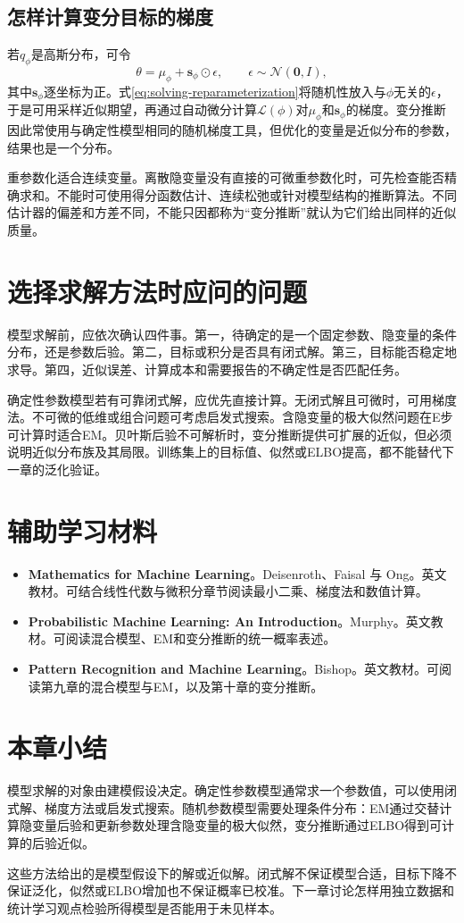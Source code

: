 \subsection{怎样计算变分目标的梯度}
若$q_\phi$是高斯分布，可令
\begin{equation}
 \theta=\mu_\phi+\bm s_\phi\odot\epsilon,
 \qquad \epsilon\sim\mathcal N(\bm0,I),
 \label{eq:solving-reparameterization}
\end{equation}
其中$\bm s_\phi$逐坐标为正。式\eqref{eq:solving-reparameterization}将随机性放入与$\phi$无关的$\epsilon$，于是可用采样近似期望，再通过自动微分计算$\mathcal L(\phi)$对$\mu_\phi$和$\bm s_\phi$的梯度。变分推断因此常使用与确定性模型相同的随机梯度工具，但优化的变量是近似分布的参数，结果也是一个分布。

重参数化适合连续变量。离散隐变量没有直接的可微重参数化时，可先检查能否精确求和。不能时可使用得分函数估计、连续松弛或针对模型结构的推断算法。不同估计器的偏差和方差不同，不能只因都称为“变分推断”就认为它们给出同样的近似质量。

\section{选择求解方法时应问的问题}

模型求解前，应依次确认四件事。第一，待确定的是一个固定参数、隐变量的条件分布，还是参数后验。第二，目标或积分是否具有闭式解。第三，目标能否稳定地求导。第四，近似误差、计算成本和需要报告的不确定性是否匹配任务。

确定性参数模型若有可靠闭式解，应优先直接计算。无闭式解且可微时，可用梯度法。不可微的低维或组合问题可考虑启发式搜索。含隐变量的极大似然问题在E步可计算时适合EM。贝叶斯后验不可解析时，变分推断提供可扩展的近似，但必须说明近似分布族及其局限。训练集上的目标值、似然或ELBO提高，都不能替代下一章的泛化验证。

\section*{辅助学习材料}
\begin{itemize}
\item \textbf{Mathematics for Machine Learning}。Deisenroth、Faisal 与 Ong。英文教材。可结合线性代数与微积分章节阅读最小二乘、梯度法和数值计算。\cite{deisenroth2020mml}
\item \textbf{Probabilistic Machine Learning: An Introduction}。Murphy。英文教材。可阅读混合模型、EM和变分推断的统一概率表述。\cite{murphy2022pml}
\item \textbf{Pattern Recognition and Machine Learning}。Bishop。英文教材。可阅读第九章的混合模型与EM，以及第十章的变分推断。\cite{bishop2006pattern}
\end{itemize}

\section{本章小结}

模型求解的对象由建模假设决定。确定性参数模型通常求一个参数值，可以使用闭式解、梯度方法或启发式搜索。随机参数模型需要处理条件分布：EM通过交替计算隐变量后验和更新参数处理含隐变量的极大似然，变分推断通过ELBO得到可计算的后验近似。

这些方法给出的是模型假设下的解或近似解。闭式解不保证模型合适，目标下降不保证泛化，似然或ELBO增加也不保证概率已校准。下一章讨论怎样用独立数据和统计学习观点检验所得模型是否能用于未见样本。
